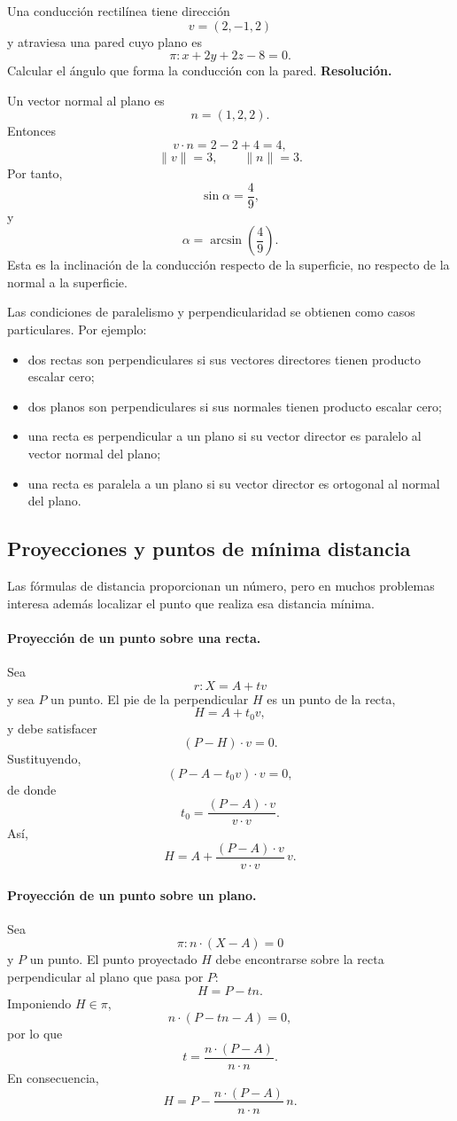 \begin{solvedexercise}
Una conducción rectilínea tiene dirección
\[
v=(2,-1,2)
\]
y atraviesa una pared cuyo plano es
\[
\pi:x+2y+2z-8=0.
\]
Calcular el ángulo que forma la conducción con la pared.
\tcblower
\textbf{Resolución.}\par\smallskip
Un vector normal al plano es
\[
n=(1,2,2).
\]
Entonces
\[
v\cdot n=2-2+4=4,
\]
\[
\|v\|=3,
\qquad
\|n\|=3.
\]
Por tanto,
\[
\sin\alpha=\frac49,
\]
y
\[
\boxed{\alpha=\arcsin\left(\frac49\right).}
\]
Esta es la inclinación de la conducción respecto de la superficie, no respecto de la normal a la superficie.
\end{solvedexercise}

Las condiciones de paralelismo y perpendicularidad se obtienen como casos particulares. Por ejemplo:
\begin{itemize}
\item dos rectas son perpendiculares si sus vectores directores tienen producto escalar cero;
\item dos planos son perpendiculares si sus normales tienen producto escalar cero;
\item una recta es perpendicular a un plano si su vector director es paralelo al vector normal del plano;
\item una recta es paralela a un plano si su vector director es ortogonal al normal del plano.
\end{itemize}

\subsection{Proyecciones y puntos de mínima distancia}

Las fórmulas de distancia proporcionan un número, pero en muchos problemas interesa además localizar el punto que realiza esa distancia mínima.

\paragraph{Proyección de un punto sobre una recta.}
Sea
\[
r:X=A+tv
\]
y sea $P$ un punto. El pie de la perpendicular $H$ es un punto de la recta,
\[
H=A+t_0v,
\]
y debe satisfacer
\[
(P-H)\cdot v=0.
\]
Sustituyendo,
\[
(P-A-t_0v)\cdot v=0,
\]
de donde
\[
\boxed{
 t_0=\frac{(P-A)\cdot v}{v\cdot v}.}
\]
Así,
\[
\boxed{
 H=A+\frac{(P-A)\cdot v}{v\cdot v}\,v.}
\]

\paragraph{Proyección de un punto sobre un plano.}
Sea
\[
\pi:n\cdot(X-A)=0
\]
y $P$ un punto. El punto proyectado $H$ debe encontrarse sobre la recta perpendicular al plano que pasa por $P$:
\[
H=P-tn.
\]
Imponiendo $H\in\pi$,
\[
n\cdot(P-tn-A)=0,
\]
por lo que
\[
t=\frac{n\cdot(P-A)}{n\cdot n}.
\]
En consecuencia,
\[
\boxed{
 H=P-\frac{n\cdot(P-A)}{n\cdot n}\,n.}
\]

